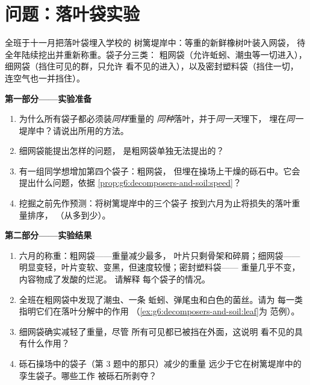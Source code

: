 \section{问题：落叶袋实验}

\begin{problem}\label{pb:g6:decomposers-and-soil:1}
全班于十一月把落叶袋埋入学校的
树篱堤岸中：等重的新鲜橡树叶装入网袋，
待全年陆续挖出并重新称重。袋子分三类：
粗网袋（允许蚯蚓、潮虫等一切进入），
细网袋（挡住可见的群，只允许
看不见的进入），以及密封塑料袋（挡住一切，
连空气也一并挡住）。

\medskip\noindent\textbf{第一部分——实验准备}
\begin{enumerate}
  \item 为什么所有袋子都必须装\emph{同样}重量的
        \emph{同种}落叶，并于\emph{同一天}埋下，
        埋在\emph{同一}堤岸中？请说出所用的方法。
  \item 细网袋能提出怎样的问题，
        是粗网袋单独无法提出的？
  \item 有一组同学想增加第四个袋子：粗网袋，
        但埋在操场上干燥的砾石中。它会
        提出什么问题，依据
        \cref{prop:g6:decomposers-and-soil:speed}？
  \item 挖掘之前先作预测：将树篱堤岸中的三个袋子
        按到六月为止将损失的落叶重量排序，
        （从多到少）。
\end{enumerate}

\medskip\noindent\textbf{第二部分——实验结果}
\begin{enumerate}[resume]
  \item 六月的称重：粗网袋——重量减少最多，
        叶片只剩骨架和碎屑；细网袋——
        明显变轻，叶片变软、变黑，但速度较慢；密封塑料袋——
        重量几乎不变，内容物成了发酸的烂泥。
        请解释
        每个袋子的情况。
  \item 全班在粗网袋中发现了潮虫、一条
        蚯蚓、弹尾虫和白色的菌丝。请为
        每一类指明它们在落叶分解中的作用
        （\cref{ex:g6:decomposers-and-soil:leaf}为
        范例）。
  \item 细网袋确实减轻了重量，尽管
        所有可见都已被挡在外面，这说明
        看不见的具有什么作用？
  \item 砾石操场中的袋子（第 3 题中的那只）减少的重量
        远少于它在树篱堤岸中的孪生袋子。哪些工作
        被砾石所剥夺？
\end{enumerate}


\end{problem}
